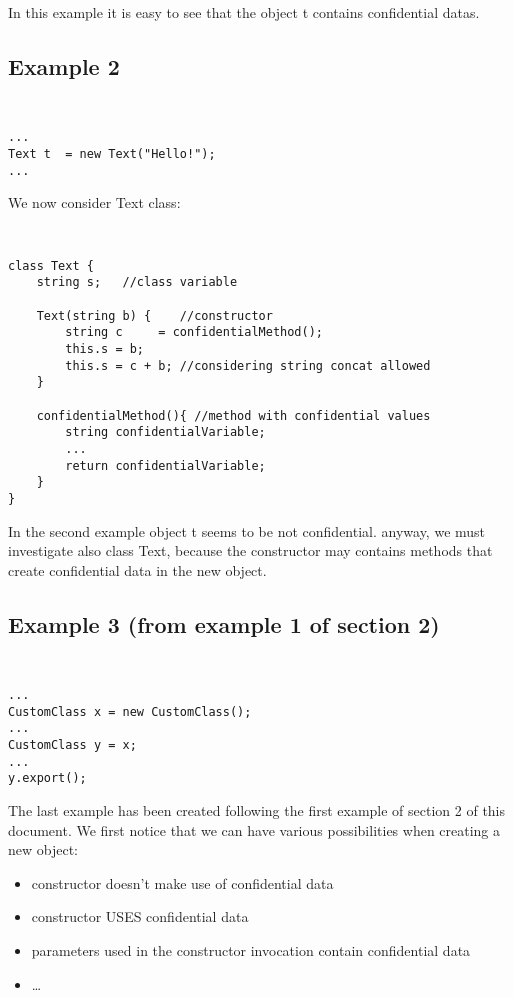 \documentclass[letterpaper,twocolumn,10pt]{article}
\begin{document}
In this example it is easy to see that the object t contains confidential datas.\\

\subsection{Example 2}
{\tt \small
\begin{verbatim}
...
Text t	= new Text("Hello!");
...
\end{verbatim}
}
We now consider Text class: \\
{\tt \small
\begin{verbatim}
class Text {
	string s;	//class variable
	
	Text(string b) { 	//constructor
		string c	 = confidentialMethod();
		this.s = b;
		this.s = c + b;	//considering string concat allowed
	}
	
	confidentialMethod(){ //method with confidential values
		string confidentialVariable;		
		...
		return confidentialVariable;
	}
}
\end{verbatim}
}

In the second example object t seems to be not confidential. anyway, we must investigate also class Text, because the constructor may contains methods that create confidential data in the new object.\\

\subsection{Example 3 (from example 1 of section 2)}
{\tt \small
\begin{verbatim}
...
CustomClass x = new CustomClass();
...
CustomClass y = x;
...
y.export();
\end{verbatim}
}

The last example has been created following the first example of section 2 of this document. We first notice that we can have various possibilities when creating a new object:\\

\begin{itemize}
  \item constructor doesn't make use of confidential data
  \item constructor USES confidential data
  \item parameters used in the constructor invocation contain confidential data
  \item \ldots
\end{itemize}
\end{document}
